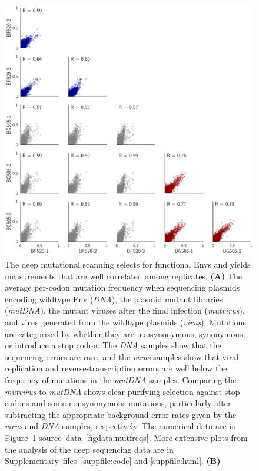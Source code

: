 \documentclass[9pt]{elife}
\begin{document}
\begin{figure}
\begin{minipage}[t]{0.65\textwidth}
\includegraphics[width=\textwidth]{figures/allprefscorr.pdf}
\end{minipage}
\caption{\label{fig:mutfreqs}
The deep mutational scanning selects for functional Envs and yields measurements that are well correlated among replicates.
{\bf (A)}
The average per-codon mutation frequency when sequencing plasmids encoding wildtype Env (\emph{DNA}), the plasmid mutant libraries (\emph{mutDNA}), the mutant viruses after the final infection (\emph{mutvirus}), and virus generated from the wildtype plasmids (\emph{virus}).
Mutations are categorized by whether they are nonsynonymous, synonymous, or introduce a stop codon. 
The \emph{DNA} samples show that the sequencing errors are rare, and the \emph{virus} samples show that viral replication and reverse-transcription errors are well below the frequency of mutations in the \emph{mutDNA} samples.
Comparing the \emph{mutvirus} to \emph{mutDNA} shows clear purifying selection against stop codons and some nonsynonymous mutations, particularly after subtracting the appropriate background error rates given by the \emph{virus} and \emph{DNA} samples, respectively.
The numerical data are in Figure~\ref{fig:mutfreqs}-source~data~\ref{figdata:mutfreqs}.
More extensive plots from the analysis of the deep sequencing data are in Supplementary~files~\ref{suppfile:code} and \ref{suppfile:html}.
{\bf (B)}
}
\end{figure}
\end{document}
